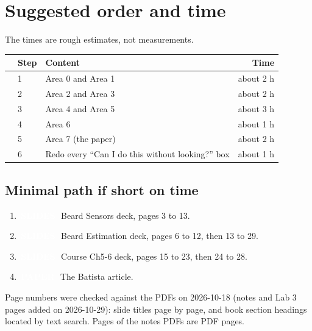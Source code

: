 \documentclass[10pt,a4paper]{article}
\newcommand{\cb}{\raisebox{-0.35ex}{\Large$\square$}}
\newcommand{\cbx}{\raisebox{-0.35ex}{\Large$\boxtimes$}}
\newcommand{\srctag}[2]{\colorbox{#1}{\textcolor{white}{\textbf{\scriptsize\,#2\,}}}}
\newcommand{\SLIDES}{\srctag{slides}{SLIDES}}
\newcommand{\PAPER}{\srctag{paper}{PAPER}}
\begin{document}
\section*{Suggested order and time}

The times are rough estimates, not measurements.

\begin{tabularx}{\textwidth}{@{}C l X r@{}}
\toprule
\cb & Step & Content & Time\\
\midrule
\cb & 1 & Area 0 and Area 1 & about 2 h\\
\cb & 2 & Area 2 and Area 3 & about 2 h\\
\cb & 3 & Area 4 and Area 5 & about 3 h\\
\cbx & 4 & Area 6 & about 1 h\\
\cb & 5 & Area 7 (the paper) & about 2 h\\
\cb & 6 & Redo every ``Can I do this without looking?'' box & about 1 h\\
\bottomrule
\end{tabularx}

\subsection*{Minimal path if short on time}

\begin{enumerate}[nosep,leftmargin=3.2em,labelsep=0.4em,label=\cb\ \arabic*.]
\item \SLIDES\ Beard Sensors deck, pages 3 to 13.
\item \SLIDES\ Beard Estimation deck, pages 6 to 12, then 13 to 29.
\item \SLIDES\ Course Ch5-6 deck, pages 15 to 23, then 24 to 28.
\item \PAPER\ The Batista article.
\end{enumerate}

\vfill
{\footnotesize Page numbers were checked against the PDFs on 2026-10-18 (notes and Lab 3 pages added on 2026-10-29): slide titles page by page, and book section headings located by text search. Pages of the notes PDFs are PDF pages.}
\end{document}
